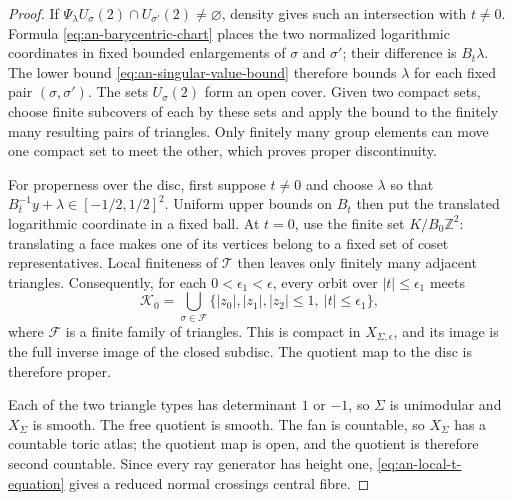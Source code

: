 \documentclass[10pt,a4paper]{amsart}
\newcommand{\ZZ}{\mathbb Z}
\begin{document}
\begin{proof}
If
$\Psi_\lambda U_\sigma(2)\cap U_{\sigma'}(2)\ne\varnothing$, density
gives such an intersection with $t\ne0$.  Formula
\eqref{eq:an-barycentric-chart} places the two normalized logarithmic
coordinates in
fixed bounded enlargements of $\sigma$ and $\sigma'$; their difference
is $B_t\lambda$.  The lower bound
\eqref{eq:an-singular-value-bound} therefore bounds $\lambda$ for each
fixed pair $(\sigma,\sigma')$.  The sets $U_\sigma(2)$ form an open
cover.  Given two compact sets, choose
finite subcovers of each by these sets and apply the bound to the finitely
many resulting pairs of triangles.  Only finitely many group elements can
move one compact set to meet the other, which proves proper discontinuity.

For properness over the disc, first suppose $t\ne0$ and choose
$\lambda$ so that
$B_t^{-1}y+\lambda\in[-1/2,1/2]^2$.
Uniform upper bounds on $B_t$ then put the translated logarithmic coordinate
in a fixed ball.  At $t=0$, use the finite set
$K/B_0\ZZ^2$: translating a face makes one of its vertices belong to a
fixed set of coset representatives.  Local finiteness of $\mathcal T$
then leaves only finitely many adjacent triangles.  Consequently, for each
$0<\epsilon_1<\epsilon$, every orbit over
$|t|\leq\epsilon_1$ meets
\begin{equation*}
 \mathcal K_0=
 \bigcup_{\sigma\in\mathcal F}
 \{|z_0|,|z_1|,|z_2|\leq1,\ |t|\leq\epsilon_1\},
\end{equation*}
where $\mathcal F$ is a finite family of triangles.  This is compact in
$X_{\Sigma,\epsilon}$, and its image is the full inverse image of the
closed subdisc.  The quotient map to the disc is therefore proper.

Each of the two triangle types has determinant $1$ or $-1$, so
$\Sigma$ is unimodular and $X_\Sigma$ is smooth.  The free quotient is
smooth.  The fan is countable, so $X_\Sigma$ has a countable toric atlas;
the quotient map is open, and the quotient is therefore second countable.
Since every ray generator has height one,
\eqref{eq:an-local-t-equation} gives a reduced normal crossings central
fibre.
\end{proof}
\end{document}

